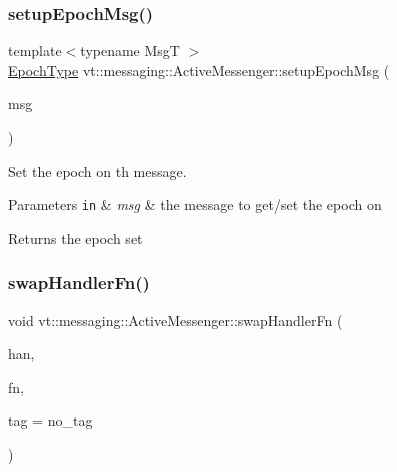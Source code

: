 \subsubsection{\texorpdfstring{setup\+Epoch\+Msg()}{setupEpochMsg()}\hspace{0.1cm}{\footnotesize\ttfamily [2/2]}}
{\footnotesize\ttfamily template$<$typename MsgT $>$ \\
\hyperlink{namespacevt_a985a5adf291c34a3ca263b3378388236}{Epoch\+Type} vt\+::messaging\+::\+Active\+Messenger\+::setup\+Epoch\+Msg (\begin{DoxyParamCaption}\item[{\hyperlink{structvt_1_1messaging_1_1_msg_shared_ptr}{Msg\+Shared\+Ptr}$<$ MsgT $>$ const \&}]{msg }\end{DoxyParamCaption})\hspace{0.3cm}{\ttfamily [inline]}}



Set the epoch on th message. 


\begin{DoxyParams}[1]{Parameters}
\mbox{\tt in}  & {\em msg} & the message to get/set the epoch on\\
\hline
\end{DoxyParams}
\begin{DoxyReturn}{Returns}
the epoch set 
\end{DoxyReturn}
\mbox{\label{structvt_1_1messaging_1_1_active_messenger_a7292f6b76137fd12553d50a87aea296b}} 
\subsubsection{\texorpdfstring{swap\+Handler\+Fn()}{swapHandlerFn()}}
{\footnotesize\ttfamily void vt\+::messaging\+::\+Active\+Messenger\+::swap\+Handler\+Fn (\begin{DoxyParamCaption}\item[{\hyperlink{namespacevt_af64846b57dfcaf104da3ef6967917573}{Handler\+Type} const \&}]{han,  }\item[{\hyperlink{namespacevt_a2a06c34cafcd511828f16cbf1476b924}{Active\+Closure\+Fn\+Type}}]{fn,  }\item[{\hyperlink{namespacevt_a84ab281dae04a52a4b243d6bf62d0e52}{Tag\+Type} const \&}]{tag = {\ttfamily no\+\_\+tag} }\end{DoxyParamCaption})}



